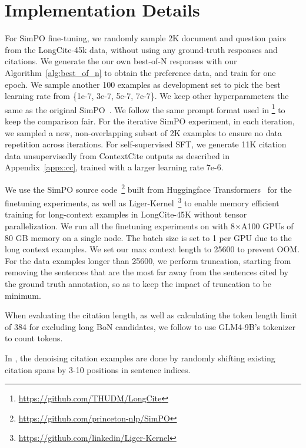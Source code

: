 \section{Implementation Details}
\label{appx:details}

For SimPO fine-tuning, we randomly sample 2K document and question pairs from the LongCite-45k data, without using any ground-truth responses and citations. We generate the our own best-of-N responses with our Algorithm~\ref{alg:best_of_n} to obtain the preference data, and train for one epoch. We sample another 100 examples as development set to pick the best learning rate from \{1e-7, 3e-7, 5e-7, 7e-7\}. We keep other hyperparameters the same as the original SimPO~\citep{meng2024simpo}. We follow the same prompt format used in \citet{zhang2024longcite}\footnote{\url{https://github.com/THUDM/LongCite}} to keep the comparison fair.
For the iterative SimPO experiment, in each iteration, we sampled a new, non-overlapping subset of 2K examples to ensure no data repetition across iterations. For self-supervised SFT, we generate 11K citation data unsupervisedly from ContextCite outputs as described in Appendix~\ref{appx:cc}, trained with a larger learning rate 7e-6. 

We use the SimPO source code~\footnote{\url{https://github.com/princeton-nlp/SimPO}} built from Huggingface Transformers~\citep{wolf-etal-2020-transformers} for the finetuning experiments, as well as Liger-Kernel~\citep{hsu2024ligerkernelefficienttriton}\footnote{\url{https://github.com/linkedin/Liger-Kernel}} to enable memory efficient training for long-context examples in LongCite-45K without tensor parallelization. 
We run all the finetuning experiments on with 8$\times$A100 GPUs of 80 GB memory on a single node. The batch size is set to 1 per GPU due to the long context examples.
We set our max context length to 25600 to prevent OOM. For the data examples longer than 25600, we perform truncation, starting from removing the sentences that are the most far away from the sentences cited by the ground truth annotation, so as to keep the impact of truncation to be minimum.

When evaluating the citation length, as well as calculating the token length limit of 384 for excluding long BoN candidates, we follow \citet{zhang2024longcite} to use GLM4-9B’s tokenizer to count tokens.

In , the denoising citation examples are done by randomly shifting existing citation spans by 3-10 positions in sentence indices.

